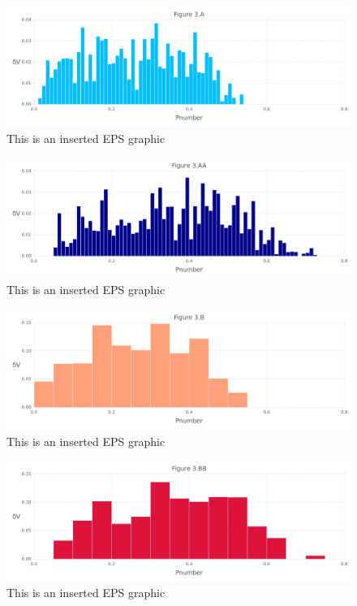 \documentclass[10pt,letterpaper]{article}
\begin{document}
\begin{figure}[ht]
\begin{center}
\includegraphics[scale=0.5]{1hvr_hol/3afigure.pdf}
\caption{This is an inserted EPS graphic}
\label{fig7}
\end{center}
\end{figure}

\begin{figure}[ht]
\begin{center}
\includegraphics[scale=0.5]{1hvr_hol/3aafigure.pdf}
\caption{This is an inserted EPS graphic}
\label{fig8}
\end{center}
\end{figure}

\begin{figure}[ht]
\begin{center}
\includegraphics[scale=0.5]{1hvr_hol/3bfigure.pdf}
\caption{This is an inserted EPS graphic}
\label{fig10}
\end{center}
\end{figure}

\begin{figure}[ht]
\begin{center}
\includegraphics[scale=0.5]{1hvr_hol/3bbfigure.pdf}
\caption{This is an inserted EPS graphic}
\label{fig11}
\end{center}
\end{figure}
\end{document}
